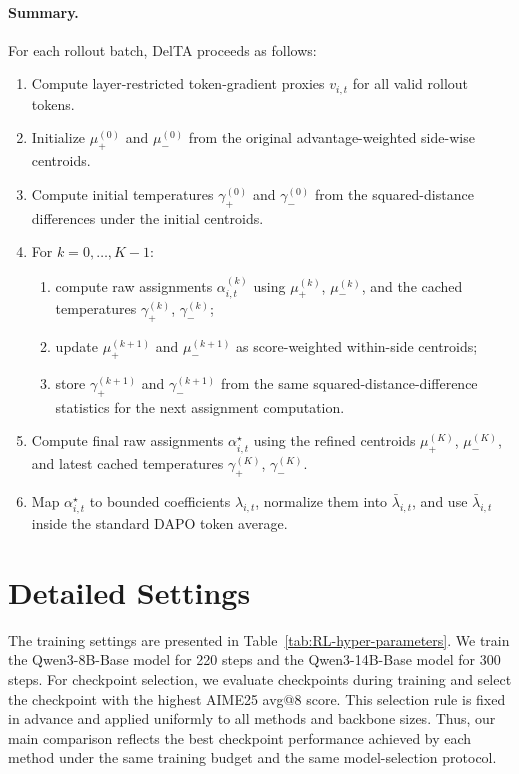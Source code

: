 \documentclass{llmxive}
\begin{document}
\paragraph{Summary.}
For each rollout batch, DelTA proceeds as follows:
\begin{enumerate}
    \item Compute layer-restricted token-gradient proxies \(v_{i,t}\) for all valid rollout tokens.
    \item Initialize \(\mu_+^{(0)}\) and \(\mu_-^{(0)}\) from the original advantage-weighted side-wise centroids.
    \item Compute initial temperatures \(\gamma_+^{(0)}\) and \(\gamma_-^{(0)}\) from the squared-distance differences under the initial centroids.
    \item For \(k=0,\dots,K-1\):
    \begin{enumerate}
        \item compute raw assignments \(\alpha_{i,t}^{(k)}\) using \(\mu_+^{(k)}\), \(\mu_-^{(k)}\), and the cached temperatures \(\gamma_+^{(k)}\), \(\gamma_-^{(k)}\);
        \item update \(\mu_+^{(k+1)}\) and \(\mu_-^{(k+1)}\) as score-weighted within-side centroids;
        \item store \(\gamma_+^{(k+1)}\) and \(\gamma_-^{(k+1)}\) from the same squared-distance-difference statistics for the next assignment computation.
    \end{enumerate}
    \item Compute final raw assignments \(\alpha_{i,t}^{\star}\) using the refined centroids \(\mu_+^{(K)}\), \(\mu_-^{(K)}\), and latest cached temperatures \(\gamma_+^{(K)}\), \(\gamma_-^{(K)}\).
    \item Map \(\alpha_{i,t}^{\star}\) to bounded coefficients \(\lambda_{i,t}\), normalize them into \(\bar\lambda_{i,t}\), and use \(\bar\lambda_{i,t}\) inside the standard DAPO token average.
\end{enumerate}

\section{Detailed Settings}
\label{app:hyp}
The training settings are presented in Table~\ref{tab:RL-hyper-parameters}. We train the Qwen3-8B-Base model for 220 steps and the Qwen3-14B-Base model for 300 steps. For checkpoint selection, we evaluate checkpoints during training and select the checkpoint with the highest AIME25 avg@8 score. This selection rule is fixed in advance and applied uniformly to all methods and backbone sizes. Thus, our main comparison reflects the best checkpoint performance achieved by each method under the same training budget and the same model-selection protocol. 
\end{document}
